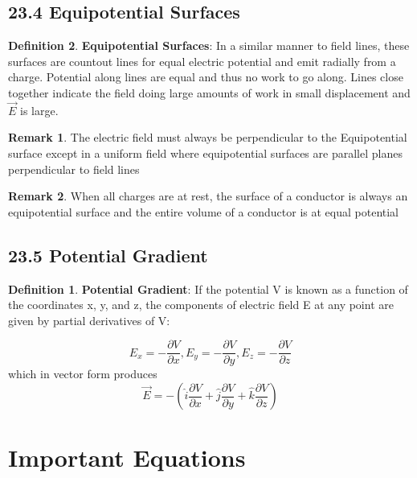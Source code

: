 \documentclass[12pt]{amsart}
\theoremstyle{definition}
\newtheorem{definition}{Definition} %
\newtheorem*{remark}{Remark}        %
\numberwithin{equation}{theorem}    %
\begin{document}
\subsection*{23.4 Equipotential Surfaces}

\begin{definition}
    \textbf{Equipotential Surfaces}:
    In a similar manner to field lines, these surfaces are countout lines for 
    equal electric potential and emit radially from a charge. Potential along lines
    are equal and thus no work to go along. Lines close together indicate the field doing 
    large amounts of work in small displacement and $\vec{E}$ is large.
    \begin{remark}
        The electric field must always be perpendicular to the Equipotential 
        surface except in a uniform field where equipotential surfaces 
        are parallel planes perpendicular to field lines
    \end{remark}

    \begin{remark}
        When all charges are at rest, the surface of a conductor is always an 
        equipotential surface and the entire volume of a conductor is at equal potential
    \end{remark}

    \subsection*{23.5 Potential Gradient}

    \begin{definition}
        \textbf{Potential Gradient}:
        If the poten­tial V is known as a function of the coordinates x, y,
        and z, the components of electric field E at any point are
        given by partial derivatives of V:

        $$E_x = -\frac{\partial V}{\partial x},E_y = -\frac{\partial V}{\partial y},
        E_z = -\frac{\partial V}{\partial z}   $$ which in vector form produces 
        $$\vec{E} = -(\hat{i}\frac{\partial V}{\partial x} 
        +\hat{j}\frac{\partial V}{\partial y} 
        + \hat{k}\frac{\partial V}{\partial z} )$$
    \end{definition}

\end{definition}



\pagebreak

\section*{Important Equations}


\textbf{}

\textbf{}
\end{document}

